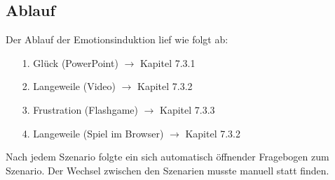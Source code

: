 \subsection{Ablauf} \label{ablauf-1}




Der Ablauf der Emotionsinduktion lief wie folgt ab:

\begin{itemize}
\item[1.] Glück (PowerPoint) $\rightarrow$ Kapitel 7.3.1
\item[2.] Langeweile (Video) $\rightarrow$ Kapitel 7.3.2
\item[3.] Frustration (Flashgame) $\rightarrow$ Kapitel 7.3.3
\item[4.] Langeweile (Spiel im Browser) $\rightarrow$ Kapitel 7.3.2
\end{itemize}

Nach jedem Szenario folgte ein sich automatisch öffnender Fragebogen zum Szenario. 
Der Wechsel zwischen den Szenarien musste manuell statt finden.
